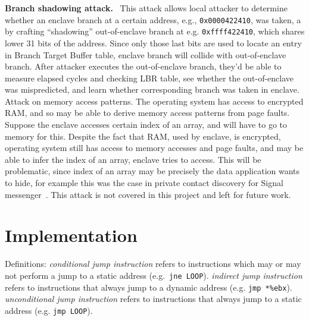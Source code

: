 \documentclass[sigplan, review]{acmart}
\begin{document}
\textbf{Branch shadowing attack.}~\cite{lee2016inferring} This attack allows local attacker to determine whether an enclave branch at a certain address, e.g., \texttt{0x0000422410}, was taken, a by crafting ``shadowing'' out-of-enclave branch at e.g. \texttt{0xffff422410}, which shares lower 31 bits of the address. Since only those last bits are used to locate an entry in Branch Target Buffer table, enclave branch will collide with out-of-enclave branch. After attacker executes the out-of-enclave branch, they'd be able to measure elapsed cycles and checking LBR table, see whether the out-of-enclave was mispredicted, and learn whether corresponding branch was taken in enclave.
Attack on memory access patterns. The operating system has access to encrypted RAM, and so may be able to derive memory access patterns from page faults. Suppose the enclave accesses certain index of an array, and will have to go to memory for this. Despite the fact that RAM, used by enclave, is encrypted, operating system still has access to memory accesses and page faults, and may be able to infer the index of an array, enclave tries to access. This will be problematic, since index of an array may be precisely the data application wants to hide, for example this was the case in private contact discovery for Signal messenger~\cite{signalprivaterecovery}. This attack is not covered in this project and left for future work.

\section{Implementation}
Definitions: \textit{conditional jump instruction} refers to instructions which may or may not perform a jump to a static address (e.g.\ \texttt{jne LOOP}). \textit{indirect jump instruction} refers to instructions that always jump to a dynamic address (e.g. \texttt{jmp *\%ebx}). \textit{unconditional jump instruction} refers to instructions that always jump to a static address (e.g. \texttt{jmp LOOP}).
\end{document}
